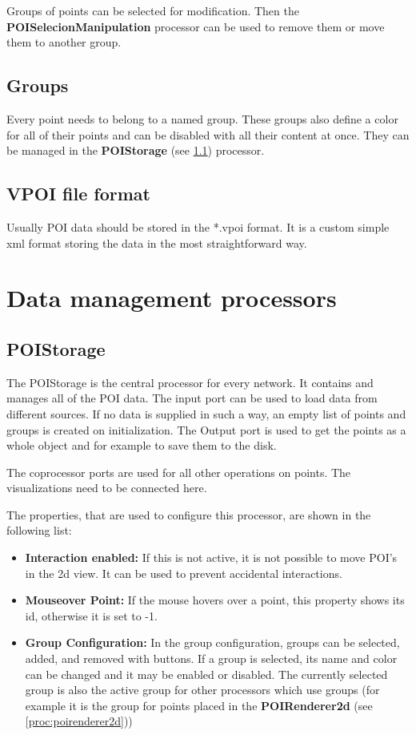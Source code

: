 \documentclass[
    fontsize=12pt,
    paper=a4,
    pagesize=auto,
    parskip=false,
    titlepage=on,
    english
]{scrartcl}
\begin{document}
Groups of points can be selected for modification. Then the \textbf{POISelecionManipulation} processor can   be used to remove them or move them to another group.

\subsection{Groups}
Every point needs to belong to a named group. These groups also define a color for all of their points and can be disabled with all their content at once. They can be managed in the \textbf{POIStorage} (see \ref{proc:poistorage}) processor.

\subsection{VPOI file format}\label{vpoi}
Usually POI data should be stored in the *.vpoi format. It is a custom simple xml format storing the data in the most straightforward way.

\section{Data management processors}
\subsection{POIStorage}\label{proc:poistorage}
The POIStorage is the central processor for every network. It contains and manages all of the POI data. The input port can be used to load data from different sources. If no data is supplied in such a way, an empty list of points and groups is created on initialization. The Output port is used to get the points as a whole object and for example to save them to the disk.

The coprocessor ports are used for all other operations on points. The visualizations need to be connected here. 

The properties, that are used to configure this processor, are shown in the following list:
\begin{itemize}
	\item \textbf{Interaction enabled:} If this is not active, it is not possible to move POI's in the 2d view. It can be used to prevent accidental interactions.
	\item \textbf{Mouseover Point:} If the mouse hovers over a point, this property shows its id, otherwise it is set to -1.
	\item \textbf{Group Configuration:} In the group configuration, groups can be selected, added, and removed with buttons. If a group is selected, its name and color can be changed and it may be enabled or disabled. The currently selected group is also the active group for other processors which use groups (for example it is the group for points placed in the \textbf{POIRenderer2d} (see \ref{proc:poirenderer2d}))
\end{itemize}
\end{document}
